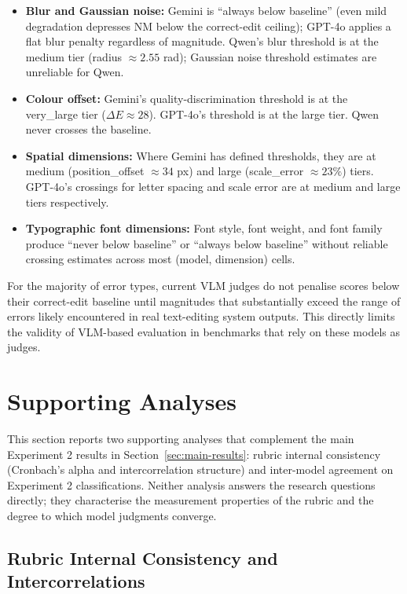 \begin{itemize}
    \item \textbf{Blur and Gaussian noise:} Gemini is ``always below baseline'' (even mild degradation depresses NM below the correct-edit ceiling); GPT-4o applies a flat blur penalty regardless of magnitude. Qwen's blur threshold is at the medium tier (radius $\approx 2.55$ rad); Gaussian noise threshold estimates are unreliable for Qwen.
    \item \textbf{Colour offset:} Gemini's quality-discrimination threshold is at the very\_large tier ($\Delta E \approx 28$). GPT-4o's threshold is at the large tier. Qwen never crosses the baseline.
    \item \textbf{Spatial dimensions:} Where Gemini has defined thresholds, they are at medium (position\_offset $\approx 34$ px) and large (scale\_error $\approx 23\%$) tiers. GPT-4o's crossings for letter spacing and scale error are at medium and large tiers respectively.
    \item \textbf{Typographic font dimensions:} Font style, font weight, and font family produce ``never below baseline'' or ``always below baseline'' without reliable crossing estimates across most (model, dimension) cells.
\end{itemize}

For the majority of error types, current VLM judges do not penalise scores below their correct-edit baseline until magnitudes that substantially exceed the range of errors likely encountered in real text-editing system outputs. This directly limits the validity of VLM-based evaluation in benchmarks that rely on these models as judges.


\section{Supporting Analyses} \label{sec:supporting-analyses}

This section reports two supporting analyses that complement the main Experiment 2 results in Section~\ref{sec:main-results}: rubric internal consistency (Cronbach's alpha and intercorrelation structure) and inter-model agreement on Experiment 2 classifications. Neither analysis answers the research questions directly; they characterise the measurement properties of the rubric and the degree to which model judgments converge.

\subsection{Rubric Internal Consistency and Intercorrelations}

